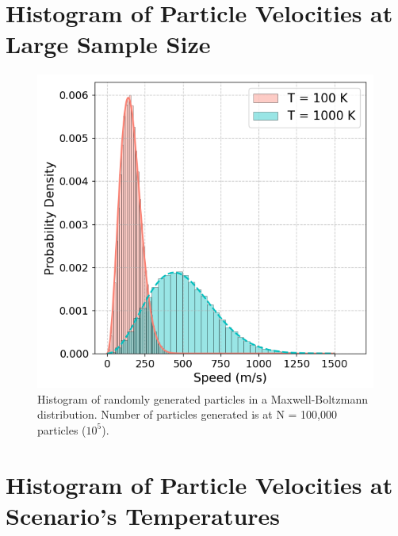 \documentclass[%
 reprint,
 amsmath,amssymb,
 aps,
]{revtex4-2}
\begin{document}
\section{Histogram of Particle Velocities at Large Sample Size}

\begin{figure}[H]
	\caption{Histogram of randomly generated particles in a Maxwell-Boltzmann distribution. Number of particles generated is at N = 100,000 particles ($10^5$).}
	\centering
	\includegraphics[scale=0.5]{appendix1.png}
\end{figure}

\section{Histogram of Particle Velocities at Scenario's Temperatures}
\end{document}
